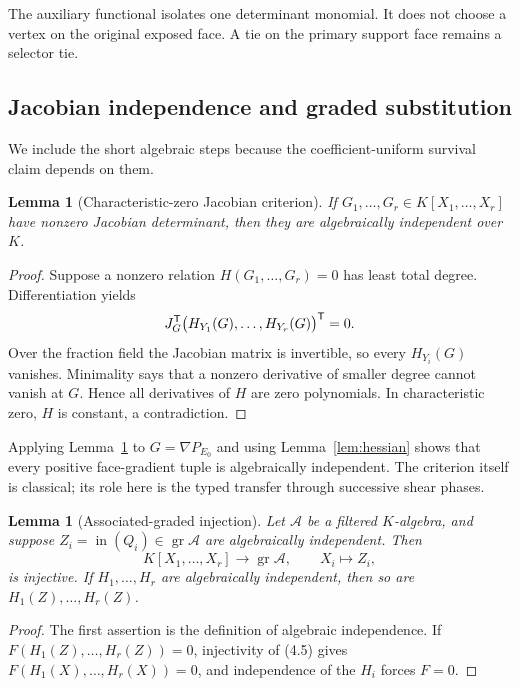 \documentclass[11pt]{article}
\newtheorem{lemma}[theorem]{Lemma}
\theoremstyle{definition}
\theoremstyle{remark}
\begin{document}
The auxiliary functional isolates one determinant monomial.  It does not
choose a vertex on the original exposed face.  A tie on the primary
support face remains a selector tie.

\subsection{Jacobian independence and graded substitution}

We include the short algebraic steps because the coefficient-uniform
survival claim depends on them.

\begin{lemma}[Characteristic-zero Jacobian criterion]
\label{lem:jacobian}
If \(G_1,\ldots,G_r\in K[X_1,\ldots,X_r]\) have nonzero Jacobian
determinant, then they are algebraically independent over \(K\).
\end{lemma}

\begin{proof}
Suppose a nonzero relation \(H(G_1,\ldots,G_r)=0\) has least total degree.
Differentiation yields
\[
 J_G^{\mathsf{T}}
 \bigl(H_{Y_1}(G),\ldots,H_{Y_r}(G)\bigr)^{\mathsf{T}}=0.
\]
Over the fraction field the Jacobian matrix is invertible, so every
\(H_{Y_i}(G)\) vanishes.  Minimality says that a nonzero derivative of
smaller degree cannot vanish at \(G\).  Hence all derivatives of \(H\) are
zero polynomials.  In characteristic zero, \(H\) is constant, a
contradiction.
\end{proof}

Applying Lemma~\ref{lem:jacobian} to
\(G=\nabla P_{E_0}\) and using Lemma~\ref{lem:hessian} shows that every
positive face-gradient tuple is algebraically independent.  The criterion
itself is classical; its role here is the typed transfer through successive
shear phases.

\begin{lemma}[Associated-graded injection]
\label{lem:graded}
Let \(\mathcal A\) be a filtered \(K\)-algebra, and suppose
\(Z_i=\operatorname{in}(Q_i)\in\operatorname{gr}\mathcal A\) are
algebraically independent.  Then
\[
 K[X_1,\ldots,X_r]\longrightarrow\operatorname{gr}\mathcal A,
 \qquad X_i\longmapsto Z_i,
\tag{4.5}
\]
is injective.  If \(H_1,\ldots,H_r\) are algebraically independent, then so
are \(H_1(Z),\ldots,H_r(Z)\).
\end{lemma}

\begin{proof}
The first assertion is the definition of algebraic independence.  If
\(F(H_1(Z),\ldots,H_r(Z))=0\), injectivity of (4.5) gives
\(F(H_1(X),\ldots,H_r(X))=0\), and independence of the \(H_i\) forces
\(F=0\).
\end{proof}
\end{document}
